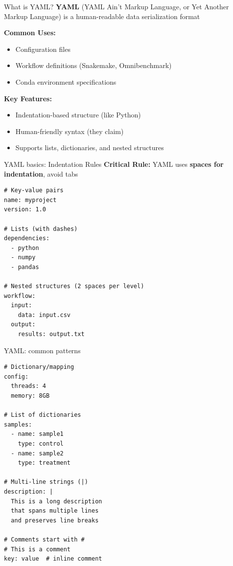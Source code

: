 \documentclass[aspectratio=169]{beamer}
\begin{document}
\begin{frame}{What is YAML?}
    \textbf{YAML} (YAML Ain't Markup Language, or Yet Another Markup Language) is a human-readable data serialization format
    
    \vspace{0.5cm}
    \textbf{Common Uses:}
    \begin{itemize}
        \item Configuration files
        \item Workflow definitions (Snakemake, Omnibenchmark)
        \item Conda environment specifications
    \end{itemize}
    
    \vspace{0.3cm}
    \textbf{Key Features:}
    \begin{itemize}
        \item Indentation-based structure (like Python)
        \item Human-friendly syntax (they claim)
        \item Supports lists, dictionaries, and nested structures
    \end{itemize}
\end{frame}

\begin{frame}[fragile]{YAML basics: Indentation Rules}
    \textbf{Critical Rule:} YAML uses \textbf{spaces for indentation}, avoid tabs
    
    \begin{lstlisting}
# Key-value pairs
name: myproject
version: 1.0

# Lists (with dashes)
dependencies:
  - python
  - numpy
  - pandas

# Nested structures (2 spaces per level)
workflow:
  input:
    data: input.csv
  output:
    results: output.txt
\end{lstlisting}
    
\end{frame}

\begin{frame}[fragile]{YAML: common patterns}
    \begin{lstlisting}
# Dictionary/mapping
config:
  threads: 4
  memory: 8GB
  
# List of dictionaries
samples:
  - name: sample1
    type: control
  - name: sample2
    type: treatment

# Multi-line strings (|)
description: |
  This is a long description
  that spans multiple lines
  and preserves line breaks

# Comments start with #
# This is a comment
key: value  # inline comment
\end{lstlisting}
\end{frame}
\end{document}
